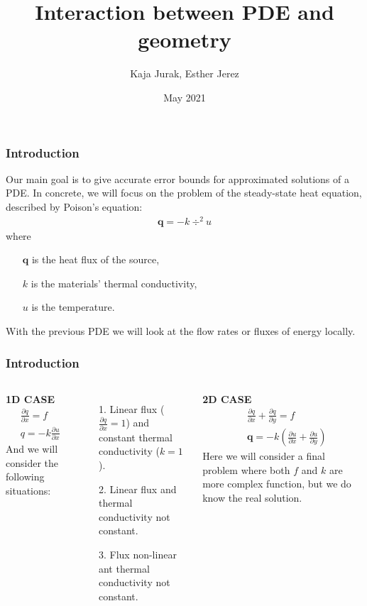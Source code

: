 \documentclass[t]{beamer}
\title{Interaction between PDE and geometry}
\author[MAT264] 
{Kaja Jurak, Esther Jerez}
\institute[UIB]
{
  Faculty of Mathematics\\
  University of Bergen
  
}
\date[2021]
{May 2021}
\begin{document}
    \frame{\titlepage}
    \begin{frame}
        \frametitle{Introduction}
        Our main goal is to give accurate error bounds for approximated solutions of a PDE. In concrete, we will focus on the problem of the steady-state heat equation, described by  \alert{Poison's equation}:
        \begin{align*}
            \bm{q} = -k \div ^2 u
        \end{align*}
    where 
    \begin{enumerate}
        \item[] $\bm{q}$ is the heat flux of the source,
        \item[] $k$ is the materials' thermal conductivity,
        \item[] $u$ is the temperature.
    \end{enumerate}
    With the previous PDE we will look at the flow rates or fluxes of energy locally. \\

    
    \end{frame}

    \begin{frame}
        \frametitle{Introduction}
        \begin{columns}[t]
            \textbf{1D CASE}
            \begin{align*}
                &\frac{\partial q}{\partial x} = f \\
                &q = -k \frac{\partial u}{\partial x} 
            \end{align*}
            And we will consider the following situations:
            \begin{itemize}
                \item[1.] Linear flux ($\frac{\partial q}{\partial x} = 1$) and constant thermal conductivity ($k=1$).
                \item[2.] Linear flux and thermal conductivity not constant.
                \item[3.] Flux non-linear ant thermal conductivity not constant.
            \end{itemize}
            
            \textbf{2D CASE} \\
            \begin{align*}
                &\frac{\partial q}{\partial x} + \frac{\partial q}{\partial y}  = f \\
                &\bm{q} = -k \left( \frac{\partial u}{\partial x} + \frac{\partial u}{\partial y}\right)
            \end{align*}
            Here we will consider a final problem where both $f$ and $k$ are more complex function, but we do know the real solution.
        \end{columns}        
    \end{frame}
\end{document}
